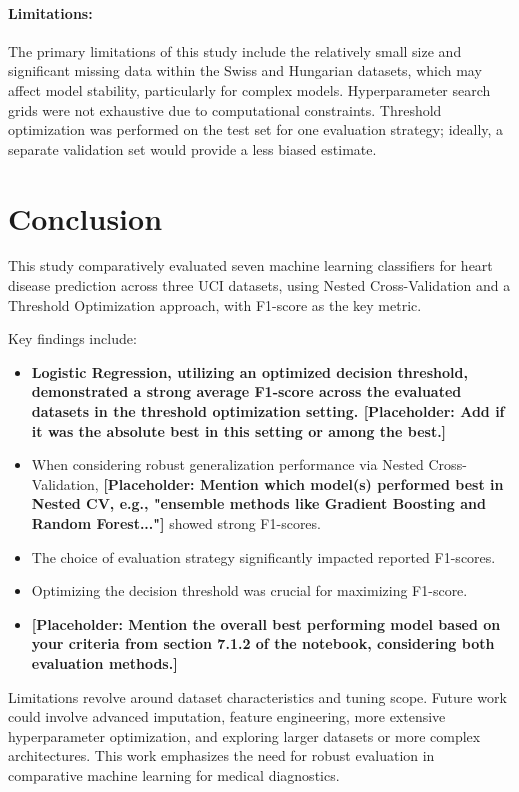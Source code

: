 \documentclass{article}
\begin{document}
\paragraph{Limitations:}
The primary limitations of this study include the relatively small size and significant missing data within the Swiss and Hungarian datasets, which may affect model stability, particularly for complex models. Hyperparameter search grids were not exhaustive due to computational constraints. Threshold optimization was performed on the test set for one evaluation strategy; ideally, a separate validation set would provide a less biased estimate.

\section{Conclusion}
This study comparatively evaluated seven machine learning classifiers for heart disease prediction across three UCI datasets, using Nested Cross-Validation and a Threshold Optimization approach, with F1-score as the key metric.

Key findings include:
\begin{itemize}
    \item \textbf{Logistic Regression, utilizing an optimized decision threshold, demonstrated a strong average F1-score across the evaluated datasets in the threshold optimization setting. \textbf{[Placeholder: Add if it was the absolute best in this setting or among the best.]}}
    \item When considering robust generalization performance via Nested Cross-Validation, \textbf{[Placeholder: Mention which model(s) performed best in Nested CV, e.g., "ensemble methods like Gradient Boosting and Random Forest..."]} showed strong F1-scores.
    \item The choice of evaluation strategy significantly impacted reported F1-scores.
    \item Optimizing the decision threshold was crucial for maximizing F1-score.
    \item \textbf{[Placeholder: Mention the overall best performing model based on your criteria from section 7.1.2 of the notebook, considering both evaluation methods.]}
\end{itemize}

Limitations revolve around dataset characteristics and tuning scope. Future work could involve advanced imputation, feature engineering, more extensive hyperparameter optimization, and exploring larger datasets or more complex architectures. This work emphasizes the need for robust evaluation in comparative machine learning for medical diagnostics.
\end{document}
